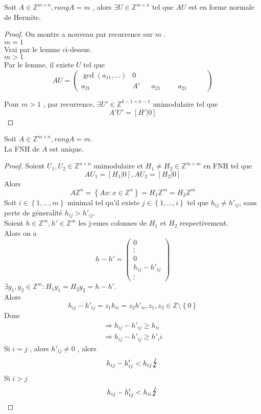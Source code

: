 \documentclass[../main.tex]{subfiles}
\begin{document}
\begin{thm}
Soit $A \in \mathbb{Z}^{m\times n}, rang A = m$ , alors $\exists U \in \mathbb{Z}^{m\times n}$  tel que $AU$ est en forme normale de Hermite.
\end{thm}
\begin{proof}
On montre a nouveau par recurrence sur $m$ .\\
$m=1$ \\
Vrai par le lemme ci-dessus.\\

$m>1$ \\
Par le lemme, il existe $U$ tel que
\[ 
A U = \begin{pmatrix}
	\gcd ( a_{11} , \ldots)  & 0 & &\\
	a_{21} & A' & &
	a_{21} &  & &
	a_{21} & & &
\end{pmatrix} 
\]


Pour $m>1$ , par recurrence, $\exists U' \in \mathbb{Z}^{k-1\times n-1}$ unimodulaire tel que 
\[ 
A' U' = [ H' |0] 
\]

\end{proof}
\begin{lemma}
Soit $A \in \mathbb{Z}^{m\times n}, rang A = m$.\\
La FNH de $A$ est unique.
\end{lemma}
\begin{proof}
	Soient $U_1, U_2 \in \mathbb{Z}^{n\times n}$ unimodulaire et $H_1 \neq H_2\in \mathbb{Z}^{m\times m}$ en FNH tel que
	\[ 
	AU_1 =[ H_1|0 ] , AU_2 = [ H_2|0] 
	\]
	Alors 
	\[ 
	A \mathbb{Z}^{n}= \left\{ Ax : x \in \mathbb{Z}^{n} \right\} = H_1 \mathbb{Z}^{m} = H_2 \mathbb{Z}^{m}
	\]
	Soit $i \in \left\{ 1, \ldots,  m \right\} $ minimal tel qu'il existe $j \in \left\{ 1, \ldots,i \right\} $ tel que $h_{ij} \neq h'_{ij} $, sans perte de géneralité $h_{ij} >h'_{ij} $.\\
	Soient $h \in \mathbb{Z}^{m}, h' \in \mathbb{Z}^{m}$ les j-emes colonnes de $H_1$ et $H_2$ respectivement.\\
	Alors on a
	\[ 
h - h' = 
\begin{pmatrix}
0\\
\vdots \\
0\\
h_{ij} - h'_{ij} \\
\vdots
\end{pmatrix} 
	\]
$\exists y_1, y_2 \in \mathbb{Z}^{m}: H_1 y_1 = H_2y_2 = h-h' $.\\
Alors 
\[ 
	h_{ij} -h'_{ij} = z_1 h_{ii} = z_2 h'_{ii} , z_1, z_2 \in \mathbb{Z}\setminus \left\{ 0 \right\} 
\]
Donc
\begin{align*}
\Rightarrow h_{ij}  - h'_{ij } \geq  h_{ii} \\
\Rightarrow h_{ij } -h'_{ij} \geq h'_ii
\end{align*}
Si $i=j$ , alors $h'_{ij} \neq 0$ , alors
\[ 
h_{ij} - h'_{ij} < h_{ij } \contra
\]
Si $i>j$ 
\[ 
h_{ij} - h'_{ij} < h_{ii}  \contra
\]
\end{proof}
\end{document}
